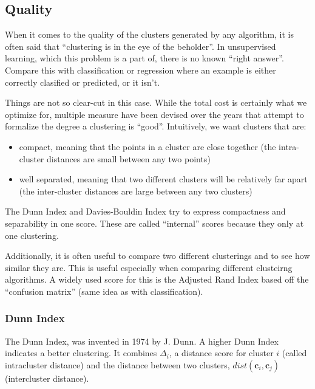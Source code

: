 \documentclass{article}
\begin{document}
\subsection{Quality}

When it comes to the quality of the clusters generated by any algorithm, it is
often said that ``clustering is in the eye of the beholder''.
In unsupervised learning, which this problem is a part of, there is no
known ``right answer''. Compare this with classification or regression where an
example is either correctly clasified or predicted, or it isn't.

Things are not so clear-cut in this case. While the total cost is certainly
what we optimize for, multiple measure have been devised over the years that
attempt to formalize the degree a clustering is ``good''.
Intuitively, we want clusters that are:
\begin{itemize}
    \item compact, meaning that the points in a cluster are close together (the
        intra-cluster distances are small between any two points)
    \item well separated, meaning that two different clusters will be
        relatively far apart (the inter-cluster distances are large between any
        two clusters)
\end{itemize}

The Dunn Index and Davies-Bouldin Index try to express compactness and
separability in one score. These are called ``internal'' scores because they
only at one clustering.

Additionally, it is often useful to compare two different clusterings and to
see how similar they are. This is useful especially when comparing different
clusteirng algorithms. A widely used score for this is the Adjusted Rand Index
based off the ``confusion matrix'' (same idea as with classification).

\subsubsection{Dunn Index}
The Dunn Index, was invented in 1974 by J. Dunn. A higher Dunn Index indicates
a better clustering. It combines $\Delta_i$, a distance score for cluster $i$
(called intracluster distance) and the distance between two clusters,
$dist(\mathbf{c}_i, \mathbf{c}_j)$ (intercluster distance).
\end{document}
